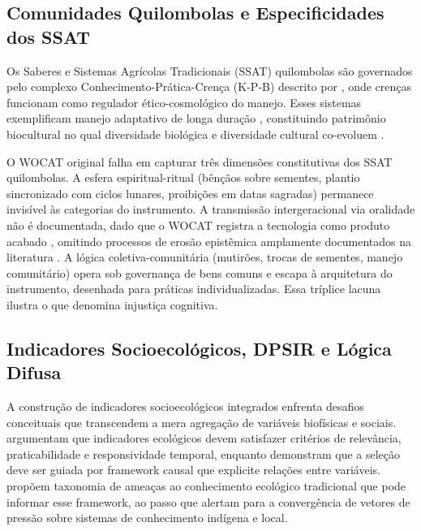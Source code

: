\documentclass[3p,times]{elsarticle}
\begin{document}
\subsection{Comunidades Quilombolas e Especificidades dos SSAT}

Os Saberes e Sistemas Agrícolas Tradicionais (SSAT) quilombolas são governados pelo complexo Conhecimento-Prática-Crença (K-P-B) descrito por \citet{Toledo2008}, onde crenças funcionam como regulador ético-cosmológico do manejo. Esses sistemas exemplificam manejo adaptativo de longa duração \citep{Berkes2017,Berkes2012}, constituindo patrimônio biocultural no qual diversidade biológica e diversidade cultural co-evoluem \citep{Maffi2001,Pretty2009,Gepts2023}.

O WOCAT original falha em capturar três dimensões constitutivas dos SSAT quilombolas. A esfera espiritual-ritual (bênçãos sobre sementes, plantio sincronizado com ciclos lunares, proibições em datas sagradas) permanece invisível às categorias do instrumento. A transmissão intergeracional via oralidade não é documentada, dado que o WOCAT registra a tecnologia como produto acabado \citep{Polanyi1966}, omitindo processos de erosão epistêmica amplamente documentados na literatura \citep{ReyesGarcia2013evidence,HedgesKipila2020,Gruberg2022}. A lógica coletiva-comunitária (mutirões, trocas de sementes, manejo comunitário) opera sob governança de bens comuns \citep{Ostrom1990} e escapa à arquitetura do instrumento, desenhada para práticas individualizadas. Essa tríplice lacuna ilustra o que \citet{Santos2007} denomina injustiça cognitiva.

\subsection{Indicadores Socioecológicos, DPSIR e Lógica Difusa}

A construção de indicadores socioecológicos integrados enfrenta desafios conceituais que transcendem a mera agregação de variáveis biofísicas e sociais. \citet{Dale2001} argumentam que indicadores ecológicos devem satisfazer critérios de relevância, praticabilidade e responsividade temporal, enquanto \citet{Niemeijer2008} demonstram que a seleção deve ser guiada por framework causal que explicite relações entre variáveis. \citet{TangGavin2016} propõem taxonomia de ameaças ao conhecimento ecológico tradicional que pode informar esse framework, ao passo que \citet{FernandezLlamazares2021} alertam para a convergência de vetores de pressão sobre sistemas de conhecimento indígena e local.
\end{document}
